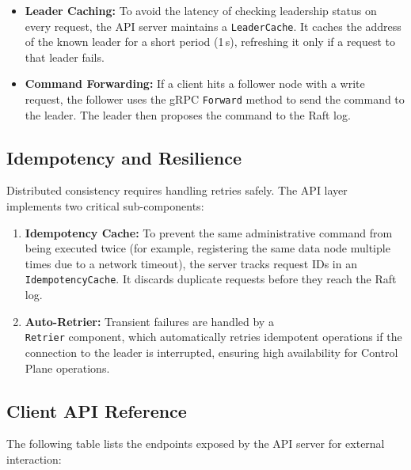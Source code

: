 \documentclass[shortabstract]{iithesis}
\begin{document}
\begin{itemize}
    \item \textbf{Leader Caching:} To avoid the latency of checking leadership status on every request, the API server maintains a \texttt{LeaderCache}. It caches the address of the known leader for a short period (1\,s), refreshing it only if a request to that leader fails.
    \item \textbf{Command Forwarding:} If a client hits a follower node with a write request, the follower uses the gRPC \texttt{Forward} method to send the command to the leader. The leader then proposes the command to the Raft log.
\end{itemize}

\subsection{Idempotency and Resilience}
Distributed consistency requires handling retries safely. The API layer implements two critical sub-components:
\begin{enumerate}
    \item \textbf{Idempotency Cache:} To prevent the same administrative command from being executed twice (for example, registering the same data node multiple times due to a network timeout), the server tracks request IDs in an \texttt{IdempotencyCache}. It discards duplicate requests before they reach the Raft log.
    \item \textbf{Auto-Retrier:} Transient failures are handled by a \\ \texttt{Retrier} component, which automatically retries idempotent operations if the connection to the leader is interrupted, ensuring high availability for Control Plane operations.
\end{enumerate}

\subsection{Client API Reference}
The following table lists the endpoints exposed by the API server for external interaction:
\end{document}
